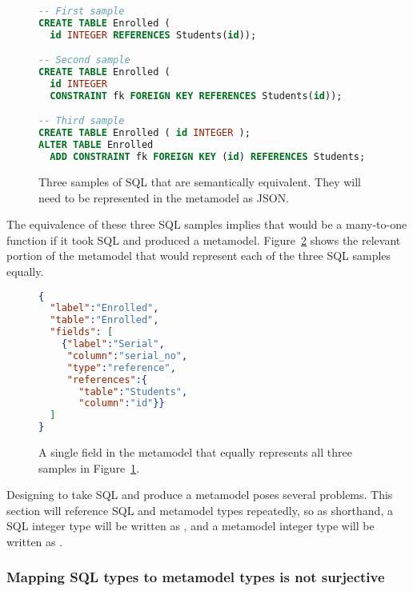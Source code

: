 \begin{figure}[h!]
\begin{lstlisting}[language=sql]
-- First sample
CREATE TABLE Enrolled (
  id INTEGER REFERENCES Students(id));

-- Second sample
CREATE TABLE Enrolled (
  id INTEGER
  CONSTRAINT fk FOREIGN KEY REFERENCES Students(id));

-- Third sample
CREATE TABLE Enrolled ( id INTEGER );
ALTER TABLE Enrolled
  ADD CONSTRAINT fk FOREIGN KEY (id) REFERENCES Students;
\end{lstlisting}
\caption{Three samples of SQL that are semantically equivalent. They will need
to be represented in the metamodel as JSON.}
\label{fig:metamodel_sql}
\end{figure}

The equivalence of these three SQL samples implies that  would be a
many-to-one function if it took SQL and produced a metamodel.
Figure~\ref{fig:metamodel_json_convert1} shows the relevant portion of the
metamodel that would represent each of the three SQL samples equally.

\begin{figure}[h!]
\begin{lstlisting}[language=json]
{
  "label":"Enrolled",
  "table":"Enrolled",
  "fields": [
    {"label":"Serial",
     "column":"serial_no",
     "type":"reference",
     "references":{
       "table":"Students",
       "column":"id"}}
  ]
}
\end{lstlisting}
\caption{A single field in the metamodel that equally represents all three
samples in Figure~\ref{fig:metamodel_sql}.}
\label{fig:metamodel_json_convert1}
\end{figure}

Designing  to take SQL and produce a metamodel poses several problems.
This section will reference SQL and metamodel types repeatedly, so as shorthand,
a SQL integer type will be written as , and a metamodel integer
type will be written as .


\subsubsection{Mapping SQL types to metamodel types is not surjective}
\label{sec:metamodel_issue1}


